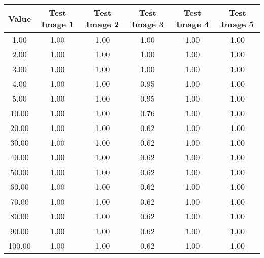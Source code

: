\begin{tabular}{|c|c|c|c|c|c|}
\hline
\textbf{Value}&\textbf{Test Image 1}&\textbf{Test Image 2}&\textbf{Test Image 3}&\textbf{Test Image 4}&\textbf{Test Image 5}\\\hline
1.00&1.00&1.00&1.00&1.00&1.00\\\hline
2.00&1.00&1.00&1.00&1.00&1.00\\\hline
3.00&1.00&1.00&1.00&1.00&1.00\\\hline
4.00&1.00&1.00&0.95&1.00&1.00\\\hline
5.00&1.00&1.00&0.95&1.00&1.00\\\hline
10.00&1.00&1.00&0.76&1.00&1.00\\\hline
20.00&1.00&1.00&0.62&1.00&1.00\\\hline
30.00&1.00&1.00&0.62&1.00&1.00\\\hline
40.00&1.00&1.00&0.62&1.00&1.00\\\hline
50.00&1.00&1.00&0.62&1.00&1.00\\\hline
60.00&1.00&1.00&0.62&1.00&1.00\\\hline
70.00&1.00&1.00&0.62&1.00&1.00\\\hline
80.00&1.00&1.00&0.62&1.00&1.00\\\hline
90.00&1.00&1.00&0.62&1.00&1.00\\\hline
100.00&1.00&1.00&0.62&1.00&1.00\\\hline
\end{tabular}
